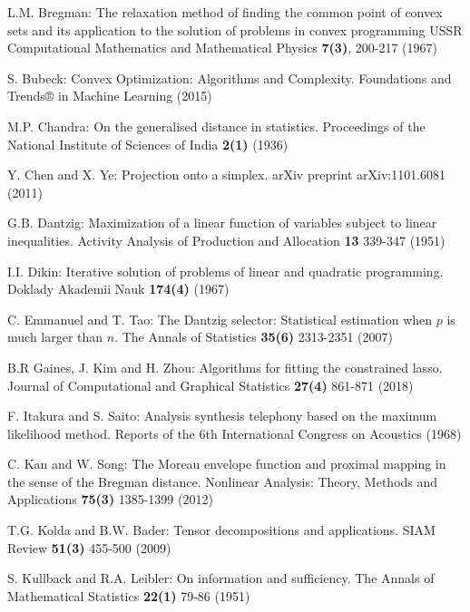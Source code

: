 \documentclass{svjour3}                %
\begin{document}
\begin{thebibliography}{10}
	L.M. Bregman: The relaxation method of finding the common point of convex sets and its application to the solution of problems in convex programming
	\newblock USSR Computational Mathematics and Mathematical Physics
	\textbf{7(3)}, 200-217 (1967)
	
	S. Bubeck: Convex Optimization: Algorithms and Complexity.
	\newblock Foundations and Trends® in Machine Learning (2015)
	
	M.P. Chandra: On the generalised distance in statistics.
	\newblock Proceedings of the National Institute of Sciences of India
	\textbf{2(1)} (1936)
	
	Y. Chen and X. Ye: Projection onto a simplex. 
	\newblock arXiv preprint arXiv:1101.6081 (2011)
	
	G.B. Dantzig: Maximization of a linear function of variables subject to linear inequalities.
	\newblock Activity Analysis of Production and Allocation
	\textbf{13} 339-347 (1951)
	
	I.I. Dikin: Iterative solution of problems of linear and quadratic programming.
	\newblock Doklady Akademii Nauk
	\textbf{174(4)} (1967)
	
	C. Emmanuel and T. Tao: The Dantzig selector: Statistical estimation when $p$ is much larger than $n$. 
	\newblock The Annals of Statistics
	\textbf{35(6)} 2313-2351 (2007)
	
	B.R Gaines, J. Kim and H. Zhou: Algorithms for fitting the constrained lasso.
	\newblock Journal of Computational and Graphical Statistics
	\textbf{27(4)} 861-871 (2018)
	
	F. Itakura and S. Saito: Analysis synthesis telephony based on the maximum likelihood method.
	\newblock Reports of the 6th International Congress on Acoustics (1968)
	
	C. Kan and W. Song: The Moreau envelope function and proximal mapping in the sense of the Bregman distance.
	\newblock Nonlinear Analysis: Theory, Methods and Applications 
	\textbf{75(3)} 1385-1399 (2012)
	
	T.G. Kolda and B.W. Bader: Tensor decompositions and applications.
	\newblock SIAM Review
	\textbf{51(3)} 455-500 (2009)
	
	S. Kullback and R.A. Leibler: On information and sufficiency.
	\newblock The Annals of Mathematical Statistics
	\textbf{22(1)} 79-86 (1951)
	

\end{thebibliography}
\end{document}

